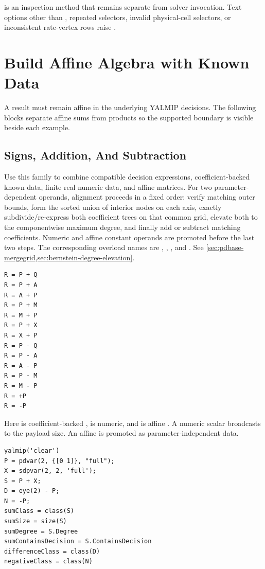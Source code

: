 \remarkshead
{} is an inspection method that remains separate from solver invocation. Text options other than , repeated selectors, invalid physical-cell selectors, or inconsistent rate-vertex rows raise \allowbreak{}.

\section{Build Affine Algebra with Known Data}
\label{sec:pdvar-algebra}

A  result must remain affine in the underlying YALMIP decisions. The following blocks separate affine sums from products so the supported boundary is visible beside each example.

\subsection{Signs, Addition, And Subtraction}

Use this family to combine compatible decision expressions, coefficient-backed known data, finite real numeric data, and affine  matrices. For two parameter-dependent operands, alignment proceeds in a fixed order: verify matching outer bounds, form the sorted union of interior nodes on each axis, exactly subdivide/re-express both coefficient trees on that common grid, elevate both to the componentwise maximum degree, and finally add or subtract matching coefficients. Numeric and affine constant operands are promoted before the last two steps. The corresponding overload names are , , , and . See \cref{sec:pdbase-mergegrid,sec:bernstein-degree-elevation}.

\syntaxhead
\begin{lstlisting}[style=dpsyntax]
R = P + Q
R = P + A
R = A + P
R = P + M
R = M + P
R = P + X
R = X + P
R = P - Q
R = P - A
R = A - P
R = P - M
R = M - P
R = +P
R = -P
\end{lstlisting}

Here  is coefficient-backed ,  is numeric, and  is affine .  A numeric scalar broadcasts to the payload size. An affine  is promoted as parameter-independent data.

\examplehead
\begin{lstlisting}[style=dpmatlab]
yalmip('clear')
P = pdvar(2, {[0 1]}, "full");
X = sdpvar(2, 2, 'full');
S = P + X;
D = eye(2) - P;
N = -P;
sumClass = class(S)
sumSize = size(S)
sumDegree = S.Degree
sumContainsDecision = S.ContainsDecision
differenceClass = class(D)
negativeClass = class(N)
\end{lstlisting}

